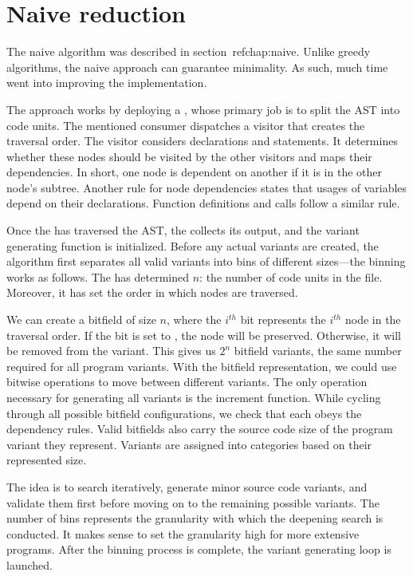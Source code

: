 \section{Naive reduction}

The naive algorithm was described in section~ref{chap:naive}.
Unlike greedy algorithms, the naive approach can guarantee minimality.
As such, much time went into improving the implementation.

The approach works by deploying a , whose 
primary job is to split the AST into code units.
The mentioned consumer dispatches a visitor that creates the traversal order.
The visitor considers declarations and statements.
It determines whether these nodes should be visited by the other visitors and 
maps their dependencies.
In short, one node is dependent on another if it is in the other node's 
subtree.
Another rule for node dependencies states that usages of variables depend on 
their declarations.
Function definitions and calls follow a similar rule.

Once the  has traversed the AST, 
the  collects its output, and the 
variant generating function is initialized.
Before any actual variants are created, the algorithm first separates all 
valid variants into bins of different sizes—the binning works as follows.
The  has determined $n$: the number of 
code units in the file.
Moreover, it has set the order in which nodes are traversed.

We can create a bitfield of size $n$, where the $i^{th}$ bit represents 
the $i^{th}$ node in the traversal order.
If the bit is set to , the node will be preserved.
Otherwise, it will be removed from the variant.
This gives us $2^n$ bitfield variants, the same number required for all 
program variants.
With the bitfield representation, we could use bitwise operations to move 
between different variants.
The only operation necessary for generating all variants is the increment 
function.
While cycling through all possible bitfield configurations, we check that 
each obeys the dependency rules.
Valid bitfields also carry the source code size of the program variant they 
represent.
Variants are assigned into categories based on their represented size.

The idea is to search iteratively, generate minor source code variants, and 
validate them first before moving on to the remaining possible variants.
The number of bins represents the granularity with which the deepening 
search is conducted.
It makes sense to set the granularity high for more extensive programs.
After the binning process is complete, the variant generating loop is 
launched.

